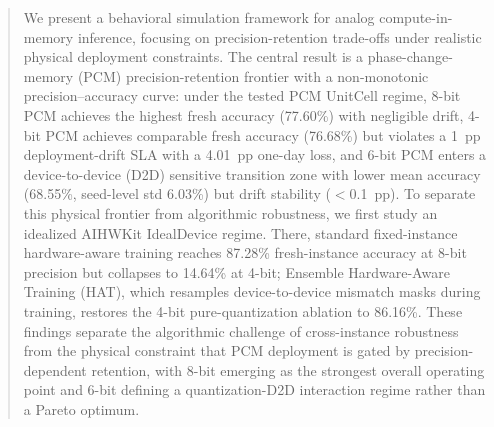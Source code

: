 \begin{abstract}
We present a behavioral simulation framework for analog compute-in-memory inference, focusing on precision-retention trade-offs under realistic physical deployment constraints. The central result is a phase-change-memory (PCM) precision-retention frontier with a non-monotonic precision--accuracy curve: under the tested PCM UnitCell regime, 8-bit PCM achieves the highest fresh accuracy (77.60\%) with negligible drift, 4-bit PCM achieves comparable fresh accuracy (76.68\%) but violates a 1~pp deployment-drift SLA with a 4.01~pp one-day loss, and 6-bit PCM enters a device-to-device (D2D) sensitive transition zone with lower mean accuracy (68.55\%, seed-level std 6.03\%) but drift stability ($<$0.1~pp). To separate this physical frontier from algorithmic robustness, we first study an idealized AIHWKit IdealDevice regime. There, standard fixed-instance hardware-aware training reaches 87.28\% fresh-instance accuracy at 8-bit precision but collapses to 14.64\% at 4-bit; Ensemble Hardware-Aware Training (HAT), which resamples device-to-device mismatch masks during training, restores the 4-bit pure-quantization ablation to 86.16\%. These findings separate the algorithmic challenge of cross-instance robustness from the physical constraint that PCM deployment is gated by precision-dependent retention, with 8-bit emerging as the strongest overall operating point and 6-bit defining a quantization-D2D interaction regime rather than a Pareto optimum.
\end{abstract}
